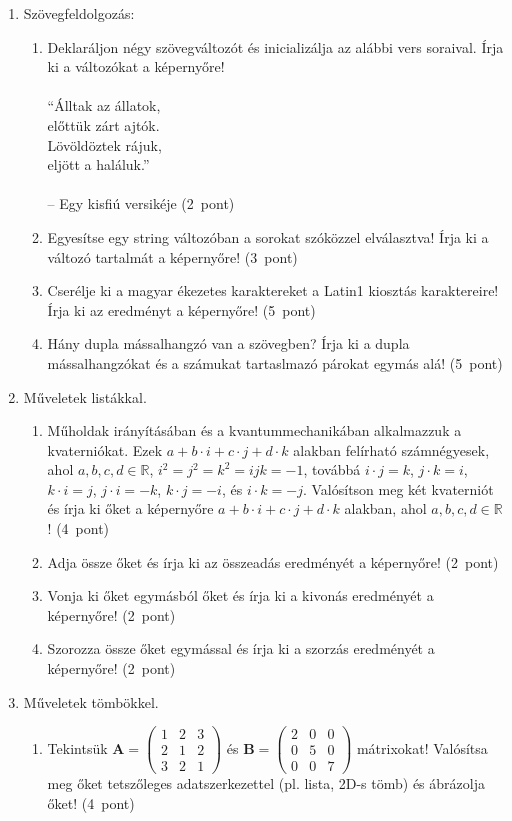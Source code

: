 \documentclass[a4paper,12pt]{letter}
\begin{document}
 \begin{enumerate}
 \item Szövegfeldolgozás:
   \begin{enumerate}
   \item Deklaráljon négy szövegváltozót és inicializálja az alábbi vers soraival. Írja ki a változókat a képernyőre! \\  \\``Álltak az állatok,\\előttük zárt ajtók.\\Lövöldöztek rájuk,\\eljött a haláluk.''\\ \\– Egy kisfiú versikéje \hfill (2~pont)
   \item Egyesítse egy string változóban a sorokat szóközzel elválasztva! Írja ki a változó tartalmát a képernyőre! \hfill (3~pont)
   \item Cserélje ki a magyar ékezetes karaktereket a Latin1 kiosztás karaktereire! Írja ki az eredményt a képernyőre! \hfill (5~pont)
   \item Hány dupla mássalhangzó van a szövegben? Írja ki a dupla mássalhangzókat és a számukat tartaslmazó párokat egymás alá! \hfill (5~pont)
   \end{enumerate}
 \item Műveletek listákkal. 
   \begin{enumerate}
   \item Műholdak irányításában és a kvantummechanikában alkalmazzuk a kvaterniókat. Ezek $a+b\cdot i+c\cdot j+d\cdot k$ alakban felírható számnégyesek, ahol $a, b, c, d \in \mathbb{R}$, $i^2=j^2=k^2=ijk=-1$, továbbá $i\cdot j=k$, $j\cdot k=i$, $k\cdot i=j$, $j\cdot i=-k$, $k\cdot j=-i$, és $i\cdot k=-j$. Valósítson meg két kvaterniót és írja ki őket a képernyőre $a+b\cdot i+c\cdot j+d\cdot k$ alakban, ahol $a, b, c, d \in \mathbb{R}$! \hfill (4~pont)
   \item Adja össze őket és írja ki az összeadás eredményét a képernyőre!  \hfill (2~pont)
   \item Vonja ki őket egymásból őket és írja ki a kivonás eredményét a képernyőre!  \hfill (2~pont)
   \item Szorozza össze őket egymással és írja ki a szorzás eredményét a képernyőre! \hfill (2~pont)
   \end{enumerate}
 \item Műveletek tömbökkel.
   \begin{enumerate}
   \item Tekintsük $\mathbf{A}=\begin{pmatrix}1 & 2 & 3  \\ 2  & 1 & 2 \\ 3 & 2  & 1 \end{pmatrix}$ és $\mathbf{B}=\begin{pmatrix}2 & 0 & 0  \\ 0  & 5 & 0 \\ 0 & 0  & 7 \end{pmatrix}$ mátrixokat! Valósítsa meg őket tetszőleges adatszerkezettel (pl. lista, 2D-s tömb) és ábrázolja őket! \hfill (4~pont)

\end{enumerate}
\end{enumerate}
\end{document}
